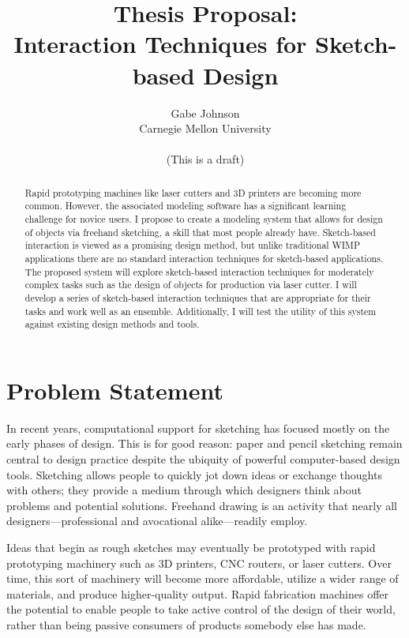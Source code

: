 \documentclass[12pt]{article}
\title{Thesis Proposal:\\
Interaction Techniques for Sketch-based Design}
\author{Gabe Johnson\\Carnegie Mellon University\\ \\ (This is a draft)}
\begin{document}
\maketitle
\newpage

\singlespacing
\tableofcontents
\doublespacing
\newpage

\doublespacing %
\begin{abstract}
Rapid prototyping machines like laser cutters and 3D printers are
becoming more common. However, the associated modeling software has a
significant learning challenge for novice users. I propose to create a
modeling system that allows for design of objects via freehand
sketching, a skill that most people already have. Sketch-based
interaction is viewed as a promising design method, but unlike
traditional WIMP applications there are no standard interaction
techniques for sketch-based applications. The proposed system will
explore sketch-based interaction techniques for moderately complex
tasks such as the design of objects for production via laser cutter. I
will develop a series of sketch-based interaction techniques that are
appropriate for their tasks and work well as an ensemble. 
Additionally, I will test the utility of this system against existing
design methods and tools.
\end{abstract}

\newpage

\section{Problem Statement}

In recent years, computational support for sketching has focused
mostly on the early phases of design. This is for good reason: paper
and pencil sketching remain central to design practice despite the
ubiquity of powerful computer-based design tools. Sketching allows
people to quickly jot down ideas or exchange thoughts with others;
they provide a medium through which designers think about problems and
potential solutions. Freehand drawing is an activity that nearly all
designers---professional and avocational alike---readily employ.

Ideas that begin as rough sketches may eventually be prototyped with
rapid prototyping machinery such as 3D printers, CNC routers, or laser
cutters. Over time, this sort of machinery will become more
affordable, utilize a wider range of materials, and produce
higher-quality output. Rapid fabrication machines offer the potential
to enable people to take active control of the design of their world,
rather than being passive consumers of products somebody else has
made.
\end{document}
